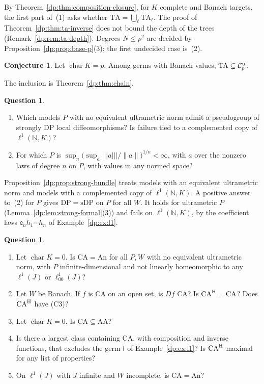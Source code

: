 \documentclass[11pt]{amsart}
\theoremstyle{definition}
\theoremstyle{remark}
\numberwithin{equation}{section}
\newcommand{\N}{\mathbb N}
\newcommand{\norm}[1]{\lVert #1\rVert}
\newcommand{\cC}{\mathcal{C}}
\theoremstyle{plain}
\theoremstyle{definition}
\newtheorem{conjecture}[theorem]{Conjecture}
\newtheorem{question}[theorem]{Question}
\theoremstyle{plain}
\begin{document}
By Theorem~\ref{dp:thm:composition-closure}, for $K$ complete and Banach targets, the first part of~(1) asks whether $\mathrm{TA}=\bigcup_\ell\mathrm{TA}_\ell$. The proof of Theorem~\ref{dp:thm:ta-inverse} does not bound the depth of the trees (Remark~\ref{dp:rem:ta-depth}). Degrees $N\le p^2$ are decided by Proposition~\ref{dp:prop:base-p}(3); the first undecided case is~(2).

\begin{conjecture}\label{dp:conj:ta}
Let $\operatorname{char}K=p$. Among germs with Banach values, $\mathrm{TA}\subsetneq\cC_p^{\rm u}$.
\end{conjecture}

The inclusion is Theorem~\ref{dp:thm:chain}.

\begin{question}\label{dp:q:strong}
\leavevmode
\begin{enumerate}
\item Which models $P$ with no equivalent ultrametric norm admit a pseudogroup of strongly DP local diffeomorphisms? Is failure tied to a complemented copy of $\ell^1(\N,K)$?
\item For which $P$ is $\sup_n\bigl(\sup_a\lvert\!\lvert\!\lvert a\rvert\!\rvert\!\rvert/\norm a\bigr)^{1/n}<\infty$, with $a$ over the nonzero laws of degree $n$ on $P$, with values in any normed space?
\end{enumerate}
\end{question}

Proposition~\ref{dp:prop:strong-bundle} treats models with an equivalent ultrametric norm and models with a complemented copy of $\ell^1(\N,K)$. A positive answer to~(2) for $P$ gives $\mathrm{DP}=\mathrm{sDP}$ on $P$ for all $W$. It holds for ultrametric $P$ (Lemma~\ref{dp:lem:strong-formal}(3)) and fails on $\ell^1(\N,K)$, by the coefficient laws $\mathsf e_nh_1\cdots h_n$ of Example~\ref{dp:ex:l1}.

\begin{question}\label{dp:q:cover}
\leavevmode
\begin{enumerate}
\item Let $\operatorname{char}K=0$. Is $\mathrm{CA}=\mathrm{An}$ for all $P,W$ with no equivalent ultrametric norm, with $P$ infinite-dimensional and not linearly homeomorphic to any $\ell^1(J)$ or $\ell^1_{00}(J)$?
\item Let $W$ be Banach. If $f$ is CA on an open set, is $Df$ CA? Is $\mathrm{CA}^{\rm H}=\mathrm{CA}$? Does $\mathrm{CA}^{\rm H}$ have \textup{(C3)}?
\item Let $\operatorname{char}K=0$. Is $\mathrm{CA}\subseteq\mathrm{AA}$?
\item Is there a largest class containing CA, with composition and inverse functions, that excludes the germ $\mathsf f$ of Example~\ref{dp:ex:l1}? Is $\mathrm{CA}^{\rm H}$ maximal for any list of properties?
\item On $\ell^1(J)$ with $J$ infinite and $W$ incomplete, is $\mathrm{CA}=\mathrm{An}$?
\end{enumerate}
\end{question}
\end{document}
